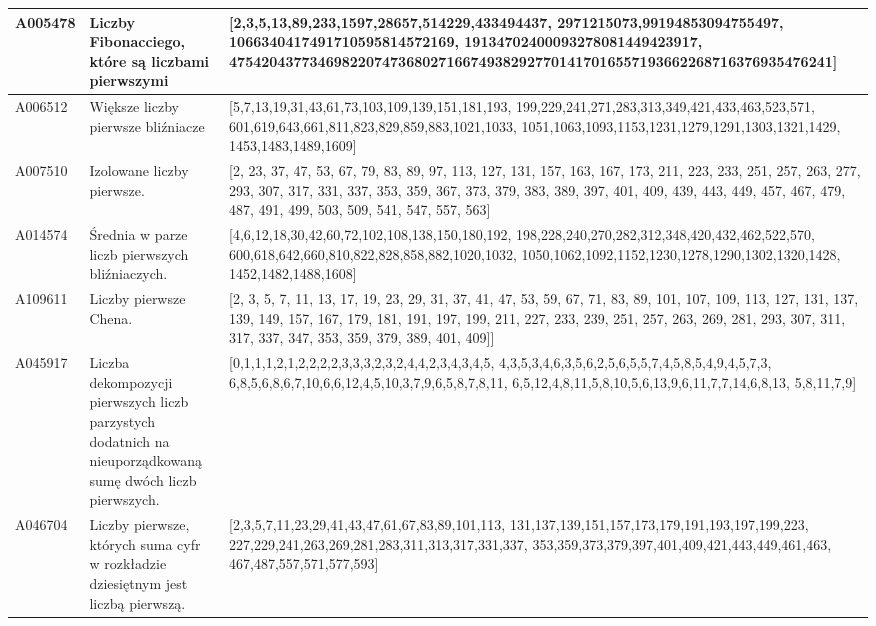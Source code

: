\documentclass[10pt,onecolumn]{article}
\theoremstyle{definition}
\theoremstyle{hypothesis}
\theoremstyle{capability}
\begin{document}
\begin{landscape}
\begin{tabular}{|C{1.8cm}|L{6cm}|L{16cm}|}
  \hline
A005478 & Liczby Fibonacciego, które są liczbami pierwszymi & 
[2,3,5,13,89,233,1597,28657,514229,433494437,
 2971215073,99194853094755497,
 1066340417491710595814572169,
 19134702400093278081449423917, 
 475420437734698220747368027166749382927701417016557193662268716376935476241] \\
 \hline
A006512 & Większe liczby pierwsze bliźniacze & 
[5,7,13,19,31,43,61,73,103,109,139,151,181,193,
 199,229,241,271,283,313,349,421,433,463,523,571,
 601,619,643,661,811,823,829,859,883,1021,1033,
 1051,1063,1093,1153,1231,1279,1291,1303,1321,1429,
 1453,1483,1489,1609] \\
  \hline
A007510  & Izolowane liczby pierwsze. & 
[2, 23, 37, 47, 53, 67, 79, 83, 89, 97, 113, 127, 131, 157, 163, 167, 173, 211, 223, 233, 251, 257, 263, 277, 293, 307, 317, 331, 337, 353, 359, 367, 373, 379, 383, 389, 397, 401, 409, 439, 443, 449, 457, 467, 479, 487, 491, 499, 503, 509, 541, 547, 557, 563] \\
  \hline
A014574  & Średnia w parze liczb pierwszych bliźniaczych. & 
[4,6,12,18,30,42,60,72,102,108,138,150,180,192,
 198,228,240,270,282,312,348,420,432,462,522,570,
 600,618,642,660,810,822,828,858,882,1020,1032,
 1050,1062,1092,1152,1230,1278,1290,1302,1320,1428,
 1452,1482,1488,1608] \\
  \hline
A109611 & Liczby pierwsze Chena. & 
[2, 3, 5, 7, 11, 13, 17, 19, 23, 29, 31, 37, 41, 47, 53, 59, 67, 71, 83, 89, 101, 107, 109, 113, 127, 131, 137, 139, 149, 157, 167, 179, 181, 191, 197, 199, 211, 227, 233, 239, 251, 257, 263, 269, 281, 293, 307, 311, 317, 337, 347, 353, 359, 379, 389, 401, 409]] \\
  \hline
A045917 & Liczba dekompozycji pierwszych liczb parzystych dodatnich na nieuporządkowaną sumę dwóch liczb pierwszych. & 
[0,1,1,1,2,1,2,2,2,2,3,3,3,2,3,2,4,4,2,3,4,3,4,5,
 4,3,5,3,4,6,3,5,6,2,5,6,5,5,7,4,5,8,5,4,9,4,5,7,3,
 6,8,5,6,8,6,7,10,6,6,12,4,5,10,3,7,9,6,5,8,7,8,11,
 6,5,12,4,8,11,5,8,10,5,6,13,9,6,11,7,7,14,6,8,13,
 5,8,11,7,9] \\
  \hline
A046704 & Liczby pierwsze, których suma cyfr w rozkładzie dziesiętnym jest liczbą pierwszą. & 
[2,3,5,7,11,23,29,41,43,47,61,67,83,89,101,113,
 131,137,139,151,157,173,179,191,193,197,199,223,
 227,229,241,263,269,281,283,311,313,317,331,337,
 353,359,373,379,397,401,409,421,443,449,461,463,
 467,487,557,571,577,593] \\
  \hline
\end{tabular}

\end{landscape}
\end{document}

